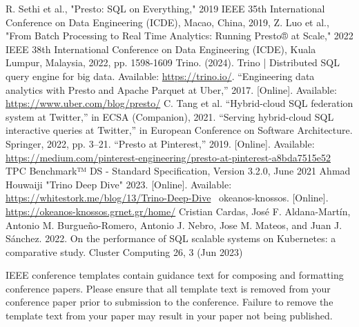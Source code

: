 \documentclass[conference]{IEEEtran}
\begin{document}
\begin{thebibliography}{00}
     R. Sethi et al., "Presto: SQL on Everything," 2019 IEEE 35th International Conference on Data Engineering (ICDE), Macao, China, 2019,
     Z. Luo et al., "From Batch Processing to Real Time Analytics: Running Presto® at Scale," 2022 IEEE 38th International Conference on Data Engineering (ICDE), Kuala Lumpur, Malaysia, 2022, pp. 1598-1609
     Trino. (2024). Trino | Distributed SQL query engine for big data. Available: \href{https://trino.io/}{https://trino.io/}.
     “Engineering data analytics with Presto and Apache Parquet at Uber,” 2017. [Online]. Available: \href{https://www.uber.com/blog/presto/}{https://www.uber.com/blog/presto/}
     C. Tang et al. “Hybrid-cloud SQL federation system at Twitter,” in ECSA (Companion), 2021.
     “Serving hybrid-cloud SQL interactive queries at Twitter,” in European Conference on Software Architecture. Springer, 2022, pp. 3–21.
     “Presto at Pinterest,” 2019. [Online]. Available: \href{https://medium.com/pinterest-engineering/presto-at-pinterest-a8bda7515e52}{https://medium.com/pinterest-engineering/presto-at-pinterest-a8bda7515e52}
     TPC Benchmark™ DS - Standard Specification, Version 3.2.0, June 2021
     Ahmad Houwaiji "Trino Deep Dive" 2023. [Online]. Available: \href{https://whitestork.me/blog/13/Trino-Deep-Dive}{https://whitestork.me/blog/13/Trino-Deep-Dive}
     ~okeanos-knossos. [Online]. \href{https://okeanos-knossos.grnet.gr/home/}{https://okeanos-knossos.grnet.gr/home/}
     Cristian Cardas, José F. Aldana-Martín, Antonio M. Burgueño-Romero, Antonio J. Nebro, Jose M. Mateos, and Juan J. Sánchez. 2022. On the performance of SQL scalable systems on Kubernetes: a comparative study. Cluster Computing 26, 3 (Jun 2023)
\end{thebibliography}
\vspace{12pt}
\color{red}
IEEE conference templates contain guidance text for composing and formatting conference papers. Please ensure that all template text is removed from your conference paper prior to submission to the conference. Failure to remove the template text from your paper may result in your paper not being published.
\end{document}
